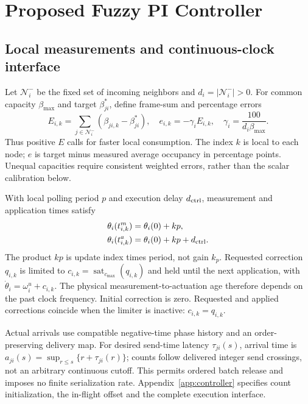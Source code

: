 \section{Proposed Fuzzy PI Controller}
\label{sec:fpi_controller}

\subsection{Local measurements and continuous-clock interface}
\label{subsec:fpi_laws}
Let $\mathcal N_i^-$ be the fixed set of incoming neighbors and
$d_i=|\mathcal N_i^-|>0$. For common capacity $\beta_{\max}$ and target
$\beta_{ji}^*$, define frame-sum and percentage errors
\begin{equation}
 E_{i,k}=\sum_{j\in\mathcal N_i^-}(\beta_{ji,k}-\beta_{ji}^*),
 \quad e_{i,k}=-\gamma_iE_{i,k},\quad\gamma_i=\frac{100}{d_i\beta_{\max}}.
 \label{eq:fpi_error}
\end{equation}
Thus positive $E$ calls for faster local consumption. The index $k$
is local to each node; $e$ is target minus measured average occupancy
in percentage points. Unequal capacities require consistent weighted
errors, rather than the scalar calibration below.

With local polling period $p$ and execution delay $d_{\rm ctrl}$,
measurement and application times satisfy
\begin{align}
 \theta_i(t^m_{i,k})&=\theta_i(0)+kp,\nonumber\\
 \theta_i(t^a_{i,k})&=\theta_i(0)+kp+d_{\rm ctrl}.
 \label{eq:fpi_local_schedule}
\end{align}
The product $kp$ is update index times period, not gain $k_p$.
Requested correction $q_{i,k}$ is limited to
$c_{i,k}=\operatorname{sat}_{c_{\max}}(q_{i,k})$ and held until the
next application, with $\dot\theta_i=\omega_i^u+c_{i,k}$.
The physical measurement-to-actuation age therefore depends on the
past clock frequency. Initial correction is zero. Requested and
applied corrections coincide when the limiter is inactive: $c_{i,k}=q_{i,k}$.

Actual arrivals use compatible negative-time phase history and an
order-preserving delivery map. For desired send-time latency
$\tau_{ji}(s)$, arrival time is
$a_{ji}(s)=\sup_{r\le s}\{r+\tau_{ji}(r)\}$; counts follow delivered
integer send crossings, not an arbitrary continuous cutoff. This
permits ordered batch release and imposes no finite serialization rate.
Appendix~\ref{app:controller} specifies count initialization, the
in-flight offset and the complete execution interface.

